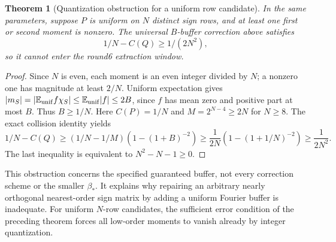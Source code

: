 \documentclass[11pt]{article}
\newtheorem{theorem}{Theorem}
\begin{document}
\begin{theorem}[Quantization obstruction for a uniform row candidate]
In the same parameters, suppose $P$ is uniform on $N$ distinct sign
rows, and at least one first or second moment is nonzero. The universal
$B$-buffer correction above satisfies
\[
 1/N-C(Q)\ge1/(2N^2),
\]
so it cannot enter the round6 extraction window.
\end{theorem}
\begin{proof}
Since $N$ is even, each moment is an even integer divided by $N$;
a nonzero one has magnitude at least $2/N$. Uniform expectation
gives $|m_S|=|\mathbb E_{\rm unif} f\chi_S|
\le\mathbb E_{\rm unif}|f|\le2B$, since $f$ has mean zero
and positive part at most $B$. Thus $B\ge1/N$.
Here $C(P)=1/N$ and $M=2^{N-4}\ge2N$ for $N\ge8$.
The exact collision identity yields
\[
 1/N-C(Q)\ge(1/N-1/M)\left(1-(1+B)^{-2}\right)
 \ge\frac1{2N}\left(1-(1+1/N)^{-2}\right)
 \ge\frac1{2N^2}.
\]
The last inequality is equivalent to $N^2-N-1\ge0$.
\end{proof}
This obstruction concerns the specified guaranteed buffer, not every
correction scheme or the smaller $\beta_*$. It explains why repairing
an arbitrary nearly orthogonal nearest-order sign matrix by adding a
uniform Fourier buffer is inadequate. For uniform $N$-row candidates,
the sufficient error condition of the preceding theorem forces all
low-order moments to vanish already by integer quantization.
\end{document}
